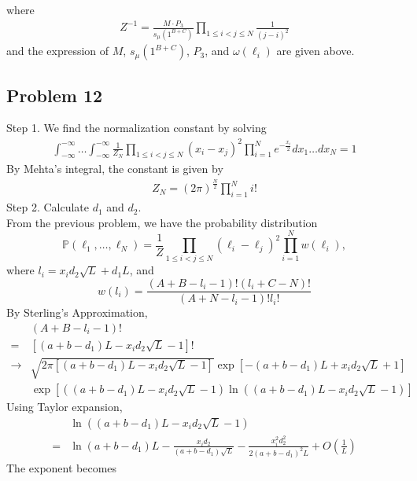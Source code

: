 \documentclass[12pt]{article}
\begin{document}
	where
	\begin{align*}
	Z^{-1}=\frac{M\cdot P_{3}}{s_{\mu}(1^{B+C})}\prod_{1\leqslant i<j\leqslant N}\frac{1}{(j-i)^{2}}
	\end{align*}
	and the expression of $M$, $s_{\mu}(1^{B+C})$, $P_{3}$, and $\omega(\ell_{i})$ are given above.
	
	\subsection*{Problem 12}
	
Step 1. We find the normalization constant by solving
\begin{align*}
\int_{-\infty}^{-\infty} \dots \int_{-\infty}^{-\infty} 
\frac{1}{Z_N} \prod_{1 \leq i < j \leq N} (x_i - x_j)^2 \prod_{i = 1}^N e^{-\frac{x_i}{2}} dx_1\dots dx_N = 1
\end{align*}
By Mehta's integral, the constant is given by
\begin{align*}
Z_N = (2\pi)^{\frac{N}{2}} \prod_{i=1}^N i!
\end{align*}
Step 2. Calculate $d_1$ and $d_2$. \\
From the previous problem, we have the probability distribution
\begin{equation}\label{Eqn1}
	\mathbb{P}(\ell_1, \dots, \ell_N) = \frac{1}{Z} \prod_{1 \leq i < j \leq N} (\ell_i - \ell_j)^2 \prod_{i = 1}^Nw(\ell_i),
\end{equation}
where $l_i=x_id_2\sqrt{L}+d_1L$, and
\begin{equation}\label{Eqn2}
	w(l_i) = \frac{(A+B-l_i-1)! (l_i+C-N)!}{(A+N-l_i-1)!l_i!} 
\end{equation}
By Sterling's Approximation,
\begin{align*}
	&(A+B-l_i-1)!  \\
	=& \left[(a+b-d_1)L-x_id_2\sqrt{L}-1\right]! \\
	\to& \sqrt{2\pi\left[(a+b-d_1)L-x_id_2\sqrt{L}-1\right]} 
	\exp \left[-(a+b-d_1)L+x_id_2\sqrt{L}+1\right] \\
	& \exp\left[ \left((a+b-d_1)L-x_id_2\sqrt{L}-1\right) \ln{\left((a+b-d_1)L-x_id_2\sqrt{L}-1\right)} \right] 
\end{align*}
Using Taylor expansion,
\begin{align*}
	&\ln{\left((a+b-d_1)L-x_id_2\sqrt{L}-1\right)} \\
	=& \ln(a+b-d_1)L-\frac{x_id_2}{(a+b-d_1)\sqrt{L}}-\frac{x_i^2d_2^2}{2(a+b-d_1)^2L}+O(\frac{1}{L})
\end{align*}
The exponent becomes
\end{document}
